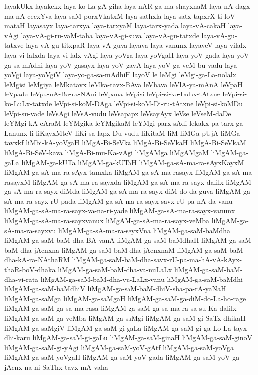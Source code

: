 {layakUkx
layakekx
laya-ko-La-gA-giha
laya-nAR-ga-ma-shayxnaM
laya-nA-dagx-ma-nA-cecxYva
laya-saM-porxVkatxM
laya-sathxla
laya-satx-tapxrX-ti-loV-mataH
layasayx
laya-tarxya
laya-tarxyaM
laya-tarx-yada
laya-vA-cakaH
laya-vAgi
laya-vA-gi-ru-vaM-taha
laya-vA-gi-suva
laya-vA-gu-tatxde
laya-vA-gu-tatxve
laya-vA-gu-titxpaR
laya-vA-guva
layava
laya-vanunx
layaveV
laya-vilalx
laya-vi-lalxda
laya-vi-lalx-vAgi
laya-yoVga
laya-yoVgaH
laya-yoV-gada
laya-yoV-ga-sa-mAdhi
laya-yoV-gasayx
laya-yoV-gavA
laya-yoV-ga-veM-bu-vadu
laya-yoVgi
laya-yoVgiV
laya-yo-ga-sa-mAdhiH
layoV
le
leMgi
leMgi-ga-La-nolalx
leMgisi
leMgiya
leMkatavx
leMka-tavx-BAva
leVhava
leVlA-ya-mAnA
leVpaH
leVpada
leVpa-nA-Ba-ra-NAni
leVpana
leVpisi
leVpi-si-ko-LuLx-tAtxne
leVpi-si-ko-LuLx-tatxde
leVpi-si-koM-DAga
leVpi-si-koM-Di-ru-tAtxne
leVpi-si-koMDu
leVpi-su-vade
leVsAgi
leVsA-vudu
leVsapapx
leVsayAyx
leVse
leVseM-daDe
leYMgi-kA-cAraM
leYMgika
leYMgikaM
leYMgi-parx-sAdi
lekakx-pa-tarx-ga-Lanunx
li
liKayxMteV
liKi-sa-lapx-Du-vudu
liKitaM
liM
liMGa-pUjA
liMGa-tavxkf
liMbi-kA-yoVgaH
liMgA-Bi-SeVka
liMgA-Bi-SeVkaH
liMgA-Bi-SeVkaM
liMgA-Bi-SeV-kava
liMgA-Bi-mu-Ka-vAgi
liMgAMga
liMgAMgaM
liMgAM-ga-gaLa
liMgAM-ga-kUTa
liMgAM-ga-kUTaH
liMgAM-ga-sA-ma-ra-sAyxKayxM
liMgAM-ga-sA-ma-ra-sAyx-tamxka
liMgAM-ga-sA-ma-rasayx
liMgAM-ga-sA-ma-rasayxM
liMgAM-ga-sA-ma-ra-sayxda
liMgAM-ga-sA-ma-ra-sayx-dalilx
liMgAM-ga-sA-ma-ra-sayx-diMda
liMgAM-ga-sA-ma-ra-sayx-diM-do-da-guva
liMgAM-ga-sA-ma-ra-sayx-rU-pada
liMgAM-ga-sA-ma-ra-sayx-savx-rU-pa-nA-da-vanu
liMgAM-ga-sA-ma-ra-sayx-va-na-ri-yade
liMgAM-ga-sA-ma-ra-sayx-vanunx
liMgAM-ga-sA-ma-ra-sayxvanux
liMgAM-ga-sA-ma-ra-sayx-veMba
liMgAM-ga-sA-ma-ra-sayxvu
liMgAM-ga-sA-ma-ra-seyxVna
liMgAM-ga-saM-baMdha
liMgAM-ga-saM-baM-dha-BA-vanA
liMgAM-ga-saM-baMdhaH
liMgAM-ga-saM-baM-dha-jAcnxna
liMgAM-ga-saM-baM-dha-jAcnxnaM
liMgAM-ga-saM-baM-dha-kA-ra-NAthaRM
liMgAM-ga-saM-baM-dha-savx-rU-pa-ma-hA-vA-kAyx-thaR-boV-dhaka
liMgAM-ga-saM-baM-dha-va-nuLaLx
liMgAM-ga-saM-baM-dha-vi-rata
liMgAM-ga-saM-baM-dha-vu-LaLx-vanu
liMgAM-ga-saM-baMdhi
liMgAM-ga-saM-baMdhiV
liMgAM-ga-saM-baM-dhiV-sha-pa-rA-yaNaH
liMgAM-ga-saMga
liMgAM-ga-saMgaH
liMgAM-ga-saM-ga-diM-do-La-ho-rage
liMgAM-ga-saM-ga-sa-ma-rasa
liMgAM-ga-saM-ga-sa-ma-ra-sa-su-Ka-dalilx
liMgAM-ga-saM-ga-veMba
liMgAM-ga-saMgi
liMgAM-ga-saM-gi-SaTx-dhikaH
liMgAM-ga-saMgiV
liMgAM-ga-saM-gi-gaLa
liMgAM-ga-saM-gi-ga-Lo-La-tayx-dhi-karu
liMgAM-ga-saM-gi-gaLu
liMgAM-ga-saM-ginaH
liMgAM-ga-saM-ginoV
liMgAM-ga-saM-gi-yAgi
liMgAM-ga-saM-yoV-gAtf
liMgAM-ga-saM-yoVga
liMgAM-ga-saM-yoVgaH
liMgAM-ga-saM-yoV-gada
liMgAM-ga-saM-yoV-ga-jAcnx-na-ni-SaThx-tavx-mA-vaha
}
